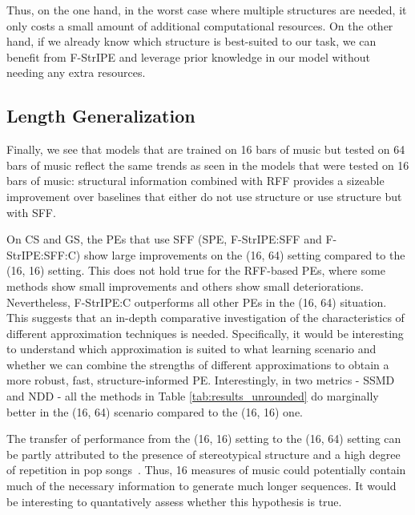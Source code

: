 Thus, on the one hand, in the worst case where multiple structures are needed, it only costs a small amount of additional computational resources. On the other hand, if we already know which structure is best-suited to our task, we can benefit from F-StrIPE and leverage prior knowledge in our model without needing any extra resources.

\subsection{Length Generalization}

Finally, we see that models that are trained on 16 bars of music but tested on 64 bars of music reflect the same trends as seen in the models that were tested on 16 bars of music: structural information combined with RFF provides a sizeable improvement over baselines that either do not use structure or use structure but with SFF.

On CS and GS, the PEs that use SFF (SPE, F-StrIPE:SFF and F-StrIPE:SFF:C) show large improvements on the (16, 64) setting compared to the (16, 16) setting. This does not hold true for the RFF-based PEs, where some methods show small improvements and others show small deteriorations. Nevertheless, F-StrIPE:C outperforms all other PEs in the (16, 64) situation. This suggests that an in-depth comparative investigation of the characteristics of different approximation techniques is needed. Specifically, it would be interesting to understand which approximation is suited to what learning scenario and whether we can combine the strengths of different approximations to obtain a more robust, fast, structure-informed PE. Interestingly, in two metrics - SSMD and NDD - all the methods in Table \ref{tab:results_unrounded} do marginally better in the (16, 64) scenario compared to the (16, 16) one.

The transfer of performance from the (16, 16) setting to the (16, 64) setting can be partly attributed to the presence of stereotypical structure and a high degree of repetition in pop songs~\cite{sargent_estimating_2017,dai_missing_2022}. Thus, 16 measures of music could potentially contain much of the necessary information to generate much longer sequences. It would be interesting to quantatively assess whether this hypothesis is true.

